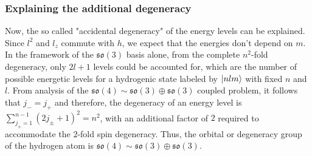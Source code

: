 \documentclass[12pt,a4paper]{report}
\theoremstyle{definition}
\theoremstyle{remark}
\theoremstyle{remark}
\begin{document}
\subsubsection{Explaining the additional degeneracy}
Now, the so called "accidental degeneracy" of the energy levels can be explained. Since $l^2$ and $l_z$ commute with $h$, we expect that the energies don't depend on $m$. In the framework of the $\mathfrak{so}(3)$ basis alone, from the complete $n^2$-fold degeneracy, only $2l+1$ levels could be accounted for, which are the number of possible energetic levels for a hydrogenic state labeled by $\ket{nlm}$ with fixed $n$ and $l$. From analysis of the $\mathfrak{so}(4)\sim \mathfrak{so}(3)\oplus \mathfrak{so}(3)$ coupled problem, it follows that $j_-=j_+$ and therefore, the degeneracy of an energy level is $\sum_{j_\pm=1}^{n-1}(2j_\pm+1)^2=n^2$, with an additional factor of $2$ required to accommodate the $2$-fold spin degeneracy. Thus, the orbital or degeneracy group of the hydrogen atom is $\mathfrak{so}(4)\sim \mathfrak{so}(3)\oplus \mathfrak{so}(3)$.
\end{document}
